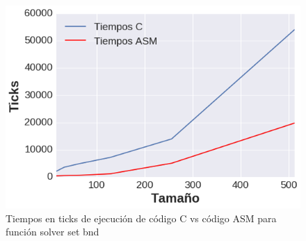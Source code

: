 \begin{figure}[h]

\centering
\includegraphics[scale=0.6] {grafica_set_bound}
  
 \caption{Tiempos en ticks de ejecución de código C vs código ASM para función solver set bnd}
\end{figure} 

